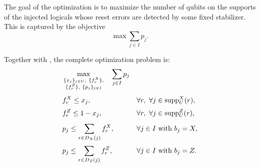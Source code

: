 The goal of the optimization is to maximize the number of qubits on the supports of the injected logicals whose reset errors are detected by some fixed stabilizer. This is captured by the objective
\begin{equation}
  \max \sum_{j \in I} p_j.
  \label{eq:objective}
\end{equation}


Together with , the complete optimization problem is:
\begin{equation}
  \label{eq:max-protection-opt}
  \begin{aligned}
    &\max_{\substack{\{x_j\}_{j \in U},\ \{f_r^X\},\\ \{f_r^Z\},\ \{p_j\}_{j \in I}}} \quad
       \sum_{j \in I} p_j
    \\[4pt]
    \quad
      & f_r^X \le x_j,
      && \forall r,\ \forall j \in \mathrm{supp}^X_U(r),
      \\[2pt]
      & f_r^Z \le 1 - x_j,
      && \forall r,\ \forall j \in \mathrm{supp}^Z_U(r),
      \\[4pt]
      & p_j \le \sum_{r \in D_X(j)} f_r^X,
      && \forall j \in I \text{ with } b_j = X,
      \\[2pt]
      & p_j \le \sum_{r \in D_Z(j)} f_r^Z,
      && \forall j \in I \text{ with } b_j = Z.
  \end{aligned}
\end{equation}

